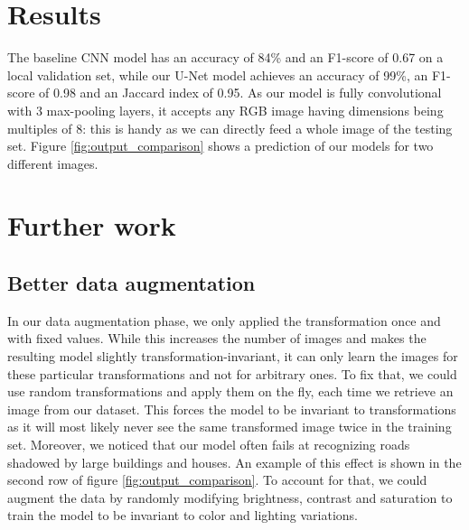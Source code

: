 \documentclass[10pt,conference,compsocconf]{IEEEtran}
\begin{document}
\section{Results}

The baseline CNN model has an accuracy of 84\% and an F1-score of 0.67 on a local validation set, while our U-Net model achieves an accuracy of 99\%, an F1-score of 0.98 and an Jaccard index of 0.95. As our model is fully convolutional with 3 max-pooling layers, it accepts any RGB image having dimensions being multiples of 8: this is handy as we can directly feed a whole image of the testing set. Figure \ref{fig:output_comparison} shows a prediction of our models for two different images. 

\section{Further work}

\subsection{Better data augmentation}
In our data augmentation phase, we only applied the transformation once and with fixed values. While this increases the number of images and makes the resulting model slightly transformation-invariant, it can only learn the images for these particular transformations and not for arbitrary ones. To fix that, we could use random transformations and apply them on the fly, each time we retrieve an image from our dataset. This forces the model to be invariant to transformations as it will most likely never see the same transformed image twice in the training set. Moreover, we noticed that our model often fails at recognizing roads shadowed by large buildings and houses. An example of this effect is shown in the second row of figure \ref{fig:output_comparison}. To account for that, we could augment the data by randomly modifying brightness, contrast and saturation to train the model to be invariant to color and lighting variations.    
\end{document}

